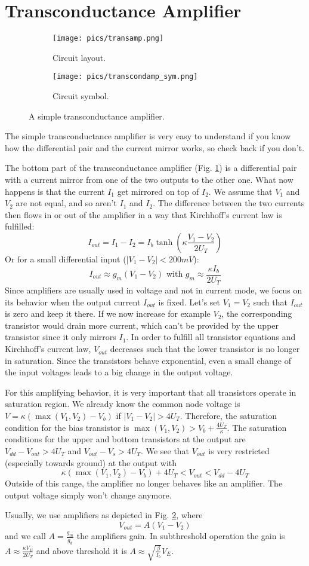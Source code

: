 \documentclass[main]{subfiles}
\begin{document}
\section{Transconductance Amplifier}
\begin{figure}[b]
\begin{subfigure} [b]{0.45\textwidth}
  \centering
  \texttt{[image: pics/transamp.png]}
  \caption{Circuit layout. \cite{lec4}}
  \label{fig:transamp}
\end{subfigure}
	\begin{subfigure} [b]{0.45\textwidth}
	\centering
	\texttt{[image: pics/transcondamp\_sym.png]}
	\caption{Circuit symbol. \cite{lec5}}
	\label{fig:transamp_sym}
	\end{subfigure}
	\label{fig:transamp_all}
	\caption{A simple transconductance amplifier.}
\end{figure}\bigskip

The simple transconductance amplifier is very easy to understand if you know how the differential pair and the current mirror works, so check back if you don't. 

The bottom part of the transconductance amplifier (Fig. \ref{fig:transamp}) is a differential pair with a current mirror from one of the two outputs to the other one. What now happens is that the current $I_1$ get mirrored on top of $I_2$. We assume that $V_1$ and $V_2$ are not equal, and so aren't $I_1$ and $I_2$. The difference between the two currents then flows in or out of the amplifier in a way that Kirchhoff's current law is fulfilled:
$$I_{out} = I_1 - I_2 = I_b \tanh\left(\kappa \frac{V_1-V_2}{2U_T}\right)$$
Or for a small differential input ($|V_1-V_2| < 200 mV$):
$$ I_{out} \approx g_m \left(V_1-V_2\right) \text{  with  } g_m \approx \frac{\kappa I_b}{2U_T}$$
Since amplifiers are usually used in voltage and not in current mode, we focus on its behavior when the output current $I_{out}$ is fixed. Let's set $V_1 = V_2$ such that $I_{out}$ is zero and keep it there. If we now increase for example $V_2$, the corresponding transistor would drain more current, which can't be provided by the upper transistor since it only mirrors $I_1$. In order to fulfill all transistor equations and Kirchhoff's current law, $V_{out}$ decreases such that the lower transistor is no longer in saturation. Since the transistors behave exponential, even a small change of the input voltages leads to a big change in the output voltage.
\par For this amplifying behavior, it is very important that all transistors operate in saturation region. We already know the common node voltage is 
$ V = \kappa \left(\max \left(V_1, V_2\right)-V_b \right)$ if $|V_1 - V_2| > 4U_T$. Therefore, the saturation condition for the bias transistor is
$\max \left(V_1, V_2\right) > V_b + \frac{4U_T}{\kappa}$. The saturation conditions for the upper and bottom transistors at the output are
$  V_{dd} - V_{out} > 4U_T$ and $V_{out} -V_s > 4U_T$. We see that $V_{out}$ is very restricted (especially towards ground) at the output with
$$\kappa\left(\max \left(V_1, V_2\right)- V_b\right) + 4U_T < V_{out} < V_{dd}-4U_T$$
Outside of this range, the amplifier no longer behaves like an amplifier. The output voltage simply won't change anymore.

Usually, we use amplifiers as depicted in Fig. \ref{fig:transamp_sym}, where 
$$V_{out}=A (V_1 -V_2)$$ 
and we call $A = \frac{g_m}{g_d}$ the amplifiers gain. In subthreshold operation the gain is $A \approx \frac{\kappa V_E}{2U_T}$ and above threshold it is $A \approx \sqrt{\frac{\beta}{I_b}}V_E$.
\end{document}
